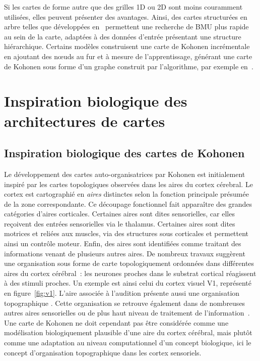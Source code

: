 \documentclass[../main]{subfiles}
\begin{document}
Si les cartes de forme autre que des grilles 1D ou 2D sont moins couramment utilisées, elles peuvent présenter des avantages. Ainsi, des cartes structurées en arbre telles que développées en~\cite{koikkalainen_self-organizing_1990} permettent une recherche de BMU plus rapide au sein de la carte, adaptées à des données d'entrée présentant une structure hiérarchique. Certains modèles construisent une carte de Kohonen incrémentale en ajoutant des n\oe{}uds au fur et à mesure de l'apprentissage, générant une carte de Kohonen sous forme d'un graphe construit par l'algorithme, par exemple en~\cite{Fritzke1995GrowingG, alahakoon_dynamic_2000, yamaguchi_adaptive_2010}.

\section{Inspiration biologique des architectures de cartes}\label{sec:bioinspi}

\subsection{Inspiration biologique des cartes de Kohonen}

Le développement des cartes auto-organisatrices par Kohonen est initialement inspiré par les cartes topologiques observées dans les aires du cortex cérebral. 
Le cortex est cartographié en \emph{aires} distinctes selon la fonction principale présumée de la zone correspondante.
Ce découpage fonctionnel fait apparaître des grandes catégories d'aires corticales. 
Certaines aires sont dites sensorielles, car elles reçoivent des entrées sensorielles via le thalamus. Certaines aires sont dites motrices et reliées aux muscles, via des structures sous corticales et permettent ainsi un contrôle moteur.
Enfin, des aires sont identifiées comme traitant des informations venant de plusieurs autres aires.
De nombreux travaux suggèrent une organisation sous forme de carte topologiquement ordonnées dans différentes aires du cortex cérébral~: les neurones proches dans le substrat cortical réagissent à des stimuli proches. 
Un exemple est ainsi celui du cortex visuel V1, représenté en figure~\ref{fig:v1}. 
L'aire associée à l'audition présente aussi une organisation topographique \parencite{Reale1980TonotopicOI}. Cette organisation se retrouve également dans de nombreuses autres aires sensorielles ou de plus haut niveau de traitement de l'information~\parencite{Kohonen1995SelfOrganizingM}. 
Une carte de Kohonen ne doit cependant pas être considérée comme une modélisation biologiquement plausible d'une aire du cortex cérébral, mais plutôt comme une adaptation au niveau computationnel d'un concept biologique, ici le concept d'organisation topographique dans les cortex sensoriels.
\end{document}

